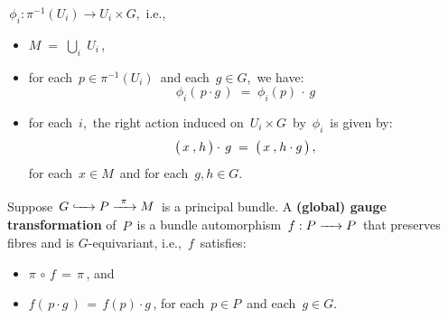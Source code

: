 \begin{definition}
\begin{itemize}
	\,$\phi_{i} : \pi^{-1}(U_{i}) \longrightarrow U_{i} \times G$,\, i.e.,
	\renewcommand{\labelitemii}{$\circ$}
	\begin{itemize}
	\item
		$M \; = \; \underset{i}{\bigcup}\;U_{i}$\,,
	\item
		for each \,$p \in \pi^{-1}(U_{i})$\, and each \,$g \in G$,\, we have:
		\begin{equation*}
		\phi_{i}(\,p \cdot g\,) \;=\; \phi_{i}(p) \,\cdot\, g
		\end{equation*}
	\item
		for each \,$i$,\, the right action induced on \,$U_{i} \times G$\, by \,$\phi_{i}$\, is given by:
		\begin{equation*}
		\left(\, x \,\overset{{\color{white}1}}{,}\, h \,\right) \cdot\, g
		\; = \;
			\left(\, x \,\overset{{\color{white}1}}{,}\, h \cdot g \,\right),
		\end{equation*}
		for each \,$x \in M$\, and for each \,$g, h \in G$.\,
	\end{itemize}
\end{itemize}
\end{definition}

\vskip 0.5cm
\begin{definition}
\label{GlobalGaugeTranformation}
\mbox{}
\vskip -0.05cm
\noindent
Suppose
\,$G \xhookrightarrow{{\color{white}222}} P \xrightarrow{{\color{white}2}\pi{\color{white}2}} M$\,
is a principal bundle.
A \textbf{(global) gauge transformation} of \,$P$\, is a bundle automorphism
\,$f : P \xrightarrow{{\color{white}222}} P$\, that preserves fibres and is $G$-equivariant, i.e.,
\,$f$\, satisfies:
\begin{itemize}
\item
	$\pi \,\circ\, f \,=\, \pi$\,, and
\item
	$f(\,p \cdot g\,) \,=\, f(p) \cdot g$\,,
	for each \,$p \in P$\, and each \,$g \in G$.\,
\end{itemize}
\end{definition}


